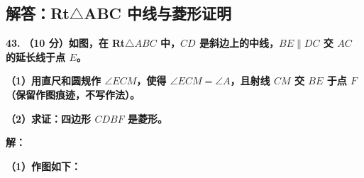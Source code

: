 ﻿%

\subsection{解答：Rt$\triangle$ABC 中线与菱形证明}

\vspace{0.6cm}

\textbf{\LARGE 43.} \textbf{（10 分）如图，在 Rt$\triangle ABC$ 中，$CD$ 是斜边上的中线，$BE \parallel DC$ 交 $AC$ 的延长线于点 $E$。}

\textbf{（1）用直尺和圆规作 $\angle ECM$，使得 $\angle ECM = \angle A$，且射线 $CM$ 交 $BE$ 于点 $F$（保留作图痕迹，不写作法）。}

\textbf{（2）求证：四边形 $CDBF$ 是菱形。}

\vspace{0.4cm}
\textbf{解：}

\textbf{（1）作图如下：}

